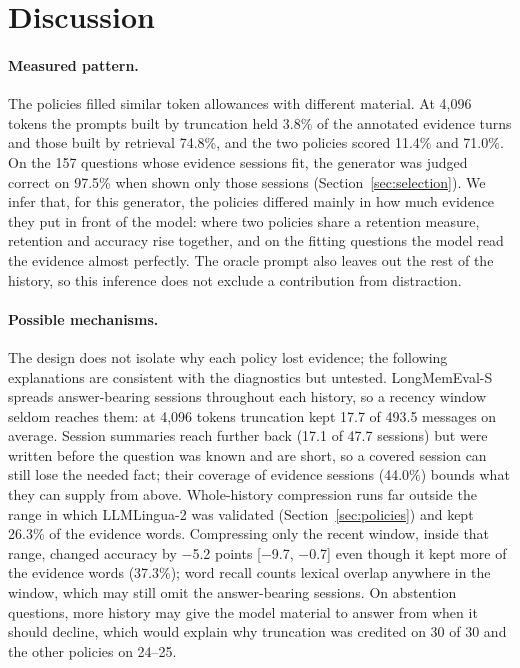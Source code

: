 {\section{Discussion}\label{sec:discussion}
\paragraph{Measured pattern.} The policies filled similar token allowances with different material. At 4,096 tokens the prompts built by truncation held 3.8\% of the annotated evidence turns and those built by retrieval 74.8\%, and the two policies scored 11.4\% and 71.0\%. On the 157 questions whose evidence sessions fit, the generator was judged correct on 97.5\% when shown only those sessions (Section~\ref{sec:selection}). We infer that, for this generator, the policies differed mainly in how much evidence they put in front of the model: where two policies share a retention measure, retention and accuracy rise together, and on the fitting questions the model read the evidence almost perfectly. The oracle prompt also leaves out the rest of the history, so this inference does not exclude a contribution from distraction.

\paragraph{Possible mechanisms.} The design does not isolate why each policy lost evidence; the following explanations are consistent with the diagnostics but untested. LongMemEval-S spreads answer-bearing sessions throughout each history, so a recency window seldom reaches them: at 4,096 tokens truncation kept 17.7 of 493.5 messages on average. Session summaries reach further back (17.1 of 47.7 sessions) but were written before the question was known and are short, so a covered session can still lose the needed fact; their coverage of evidence sessions (44.0\%) bounds what they can supply from above. Whole-history compression runs far outside the range in which LLMLingua-2 was validated (Section~\ref{sec:policies}) and kept 26.3\% of the evidence words. Compressing only the recent window, inside that range, changed accuracy by $-$5.2 points [$-$9.7, $-$0.7] even though it kept more of the evidence words (37.3\%); word recall counts lexical overlap anywhere in the window, which may still omit the answer-bearing sessions. On abstention questions, more history may give the model material to answer from when it should decline, which would explain why truncation was credited on 30 of 30 and the other policies on 24--25.

}

